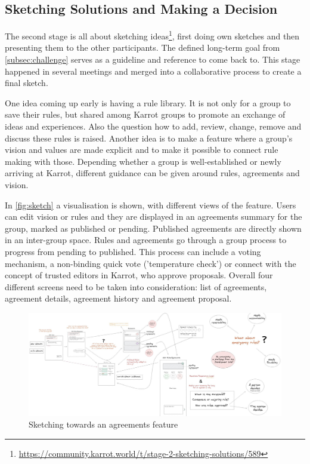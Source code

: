 \documentclass[
	a4paper,%
	11pt,%
	]{article}
\begin{document}
\subsection{Sketching Solutions and Making a Decision}

The second stage is all about sketching ideas\footnote{\label{url:2sketching}\url{https://community.karrot.world/t/stage-2-sketching-solutions/589}}, first doing own sketches and then presenting them to the other participants. The defined long-term goal from \autoref{subsec:challenge} serves as a guideline and reference to come back to. This stage happened in several meetings and merged into a collaborative process to create a final sketch.

One idea coming up early is having a rule library. It is not only for a group to save their rules, but shared among Karrot groups to promote an exchange of ideas and experiences. Also the question how to add, review, change, remove and discuss these rules is raised. Another idea is to make a feature where a group's vision and values are made explicit and to make it possible to connect rule making with those. Depending whether a group is well-established or newly arriving at Karrot, different guidance can be given around rules, agreements and vision. 

In \autoref{fig:sketch} a visualisation is shown, with different views of the feature. Users can edit vision or rules and they are displayed in an agreements summary for the group, marked as published or pending. Published agreements are directly shown in an inter-group space. Rules and agreements go through a group process to progress from pending to published. This process can include a voting mechanism, a non-binding quick vote ('temperature check') or connect with the concept of trusted editors in Karrot, who approve proposals. Overall four different screens need to be taken into consideration: list of agreements, agreement details, agreement history and agreement proposal.
    

\begin{figure}[ht]
	\includegraphics[width=\textwidth
	]{images/sketch.jpg}
	\caption{Sketching towards an agreements feature}
	\label{fig:sketch}
\end{figure}
\end{document}
